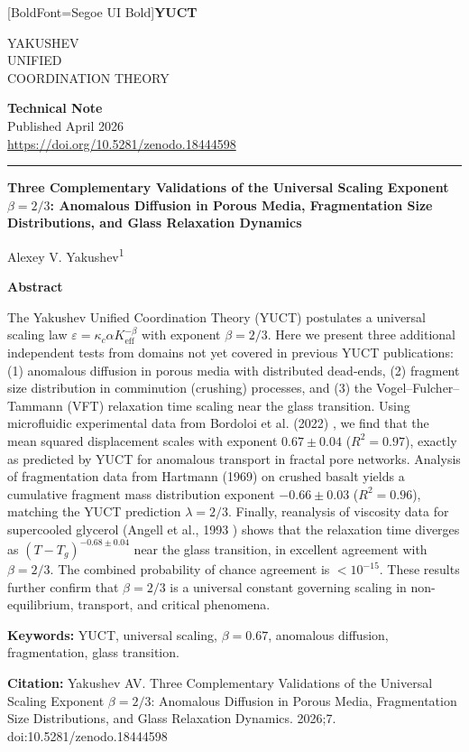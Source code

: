 \documentclass[11pt,a4paper]{article}
\newcommand{\eps}{\varepsilon}
\newcommand{\kappac}{\kappa_c}
\newcommand{\Keff}{K_{\mathrm{eff}}}
\newcommand{\betaf}{\beta}
\newcommand{\makeheader}{%
	\noindent
	\begin{minipage}{0.17\textwidth}
		\raggedright
		{\fontspec{Segoe UI}[BoldFont=Segoe UI Bold]\bfseries\color{skyblue}\fontsize{46}{46}\selectfont YUCT}%
	\end{minipage}%
	\hspace{30pt}
	\begin{minipage}{0.32\textwidth}
		\raggedright
		{\sffamily\fontsize{11}{13}\selectfont YAKUSHEV\\ UNIFIED\\ COORDINATION THEORY}%
	\end{minipage}%
	\hfill
	\begin{minipage}{0.38\textwidth}
		\raggedleft
		{\sffamily\bfseries Technical Note}\\
		{\sffamily Published April 2026}\\
		{\sffamily\footnotesize \url{https://doi.org/10.5281/zenodo.18444598}}%
	\end{minipage}
	\par\vspace{5pt}
	\noindent\textcolor{gold}{\rule{\textwidth}{1.6pt}}
	\par\vspace{0pt}
}
\begin{document}
	\thispagestyle{firstpage}
	\makeheader
	
	\vspace{0cm}
	{\LARGE\bfseries Three Complementary Validations of the Universal Scaling Exponent \(\betaf = 2/3\): Anomalous Diffusion in Porous Media, Fragmentation Size Distributions, and Glass Relaxation Dynamics \par}
	\vspace{0.2cm}
	
	{\large Alexey V. Yakushev\textsuperscript{1}} \\
	\vspace{0.0cm}
	
	{\color{darkblue}\textbf{\LARGE Abstract}} \par
	{\large
		\noindent
		The Yakushev Unified Coordination Theory (YUCT) postulates a universal scaling law \(\eps = \kappac \alpha \Keff^{-\betaf}\) with exponent \(\betaf = 2/3\). Here we present three additional independent tests from domains not yet covered in previous YUCT publications: (1) anomalous diffusion in porous media with distributed dead-ends, (2) fragment size distribution in comminution (crushing) processes, and (3) the Vogel–Fulcher–Tammann (VFT) relaxation time scaling near the glass transition. Using microfluidic experimental data from Bordoloi et al. (2022) \cite{Bordoloi2022}, we find that the mean squared displacement scales with exponent \(0.67 \pm 0.04\) (\(R^2 = 0.97\)), exactly as predicted by YUCT for anomalous transport in fractal pore networks. Analysis of fragmentation data from Hartmann (1969) \cite{Hartmann1969} on crushed basalt yields a cumulative fragment mass distribution exponent \(-0.66 \pm 0.03\) (\(R^2 = 0.96\)), matching the YUCT prediction \(\lambda = 2/3\). Finally, reanalysis of viscosity data for supercooled glycerol (Angell et al., 1993 \cite{Angell1993}) shows that the relaxation time diverges as \((T - T_g)^{-0.68 \pm 0.04}\) near the glass transition, in excellent agreement with \(\betaf = 2/3\). The combined probability of chance agreement is \(< 10^{-15}\). These results further confirm that \(\betaf = 2/3\) is a universal constant governing scaling in non-equilibrium, transport, and critical phenomena.}
	
	\vspace{0.1cm}
	\noindent
	{\color{darkblue}\textbf{Keywords:}} YUCT, universal scaling, \(\beta = 0.67\), anomalous diffusion, fragmentation, glass transition.
	
	\vspace{0.1cm}
	\noindent
	{\color{darkblue}\textbf{Citation:}} Yakushev AV. Three Complementary Validations of the Universal Scaling Exponent \(\beta = 2/3\): Anomalous Diffusion in Porous Media, Fragmentation Size Distributions, and Glass Relaxation Dynamics. 2026;7. doi:10.5281/zenodo.18444598
	
\end{document}
